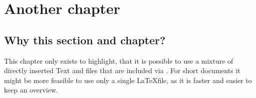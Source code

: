 \documentclass[thesis]{template/rrlab}
\begin{document}




\chapter{Another chapter}
\label{chap:addendum}

\section{Why this section and chapter?}
This chapter only exists to highlight, that it is possible
to use a mixture of directly inserted Text and files
that are included via \verb||. For short documents
it might be more feasible to use only a single \LaTeX file,
as it is faster and easier to keep an overview.


\RRLABindex

\end{document}
